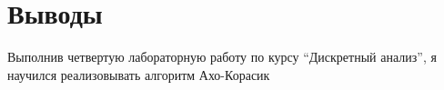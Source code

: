 \section{Выводы}

Выполнив четвертую лабораторную работу по курсу \enquote{Дискретный анализ}, я научился реализовывать алгоритм Ахо-Корасик

\pagebreak
